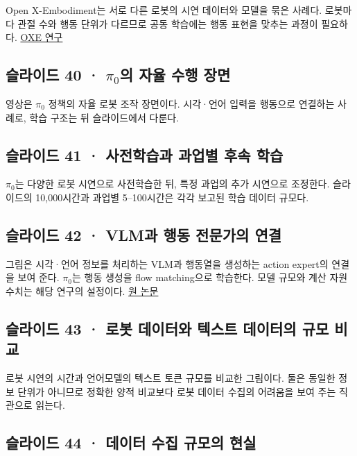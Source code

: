 \documentclass[11pt,a4paper]{article}
\begin{document}
Open X-Embodiment는 서로 다른 로봇의 시연 데이터와 모델을 묶은 사례다. 로봇마다 관절 수와 행동 단위가 다르므로 공동 학습에는 행동 표현을 맞추는 과정이 필요하다. \href{https://arxiv.org/abs/2310.08864}{OXE 연구}\par

\subsection{슬라이드 40 · $\pi_0$의 자율 수행 장면}

영상은 $\pi_0$ 정책의 자율 로봇 조작 장면이다. 시각·언어 입력을 행동으로 연결하는 사례로, 학습 구조는 뒤 슬라이드에서 다룬다.\par

\subsection{슬라이드 41 · 사전학습과 과업별 후속 학습}

$\pi_0$는 다양한 로봇 시연으로 사전학습한 뒤, 특정 과업의 추가 시연으로 조정한다. 슬라이드의 10,000시간과 과업별 5–100시간은 각각 보고된 학습 데이터 규모다.\par

\subsection{슬라이드 42 · VLM과 행동 전문가의 연결}

그림은 시각·언어 정보를 처리하는 VLM과 행동열을 생성하는 action expert의 연결을 보여 준다. $\pi_0$는 행동 생성을 flow matching으로 학습한다. 모델 규모와 계산 자원 수치는 해당 연구의 설정이다. \href{https://arxiv.org/abs/2410.24164}{원 논문}\par

\subsection{슬라이드 43 · 로봇 데이터와 텍스트 데이터의 규모 비교}

로봇 시연의 시간과 언어모델의 텍스트 토큰 규모를 비교한 그림이다. 둘은 동일한 정보 단위가 아니므로 정확한 양적 비교보다 로봇 데이터 수집의 어려움을 보여 주는 직관으로 읽는다.\par

\subsection{슬라이드 44 · 데이터 수집 규모의 현실}
\end{document}
